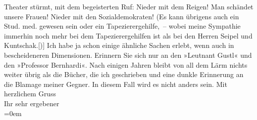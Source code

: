 \begin{ledgroupsized}[t]{13cm}
               Theater stürmt, mit dem begeisterten Ruf: Nieder mit dem Reigen! Man schändet unsere
               Frauen! Nieder mit den Sozialdemokraten! (Es kann übrigens auch ein Stud. med.
               gewesen sein oder ein Tapezierergehilfe, – wobei meine Sympathie immerhin noch mehr
               bei dem Tapezierergehilfen ist als bei den Herren Seipel und Kuntschak.{[}){]} Ich habe ja schon einige ähnliche Sachen
               erlebt, wenn auch in bescheideneren Dimensionen. Erinnern Sie sich nur an den »Leutnant Gustl« und den »Professor Bernhardi«. Nach einigen Jahren bleibt von all dem
               Lärm nichts weiter übrig als die Bücher, die ich geschrieben und eine dunkle
               Erinnerung an die Blamage meiner Gegner. In diesem Fall wird es nicht anders
               sein.\pend
           \pstart
           Mit herzlichem Gruss{\\[\baselineskip]}Ihr sehr ergebener{\\[\baselineskip]}\pend
           \leftskip=0em{}          \endnumbering{}\end{ledgroupsized}  \newcommand{\dateiname}{L02363}\newcommand{\titel}{Arthur Schnitzler an Stefan Großmann, 17. 2. 1921}\newcommand{\editorInnen}{Martin Anton Müller und Gerd-Hermann Susen}
            \footnotesize
\begin{ledgroupsized}[t]{11.5cm}
\end{ledgroupsized}
         
      